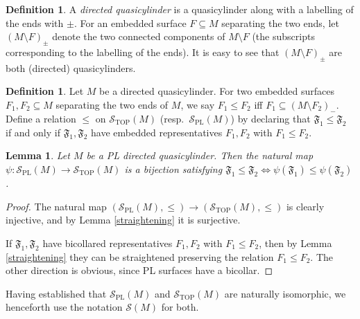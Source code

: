 \documentclass[12pt]{article}
\theoremstyle{plain}
\newtheorem{lemma}[theorem]{Lemma}
\theoremstyle{definition}
\newtheorem{definition}[theorem]{Definition}
\theoremstyle{remark}
\numberwithin{equation}{section}
\begin{document}
\begin{definition}
A \emph{directed quasicylinder} is a quasicylinder along with a labelling of the ends with $\pm$.  For an embedded surface $F\subseteq M$ separating the two ends, let $(M\setminus F)_\pm$ denote the two connected components of $M\setminus F$ (the subscripts corresponding to the labelling of the ends).  It is easy to see that $(M\setminus F)_\pm$ are both (directed) quasicylinders.
\end{definition}

\begin{definition}
Let $M$ be a directed quasicylinder.  For two embedded surfaces $F_1,F_2\subseteq M$ separating the two ends of $M$, we say $F_1\leq F_2$ iff $F_1\subseteq(M\setminus F_2)_-$.  Define a relation $\leq$ on $\mathcal S_{\operatorname{TOP}}(M)$ (resp.\ $\mathcal S_{\operatorname{PL}}(M)$) by declaring that $\mathfrak F_1\leq\mathfrak F_2$ if and only if $\mathfrak F_1,\mathfrak F_2$ have embedded representatives $F_1,F_2$ with $F_1\leq F_2$.
\end{definition}

\begin{lemma}\label{pltopequiv}
Let $M$ be a PL directed quasicylinder.  Then the natural map $\psi:\mathcal S_{\operatorname{PL}}(M)\to\mathcal S_{\operatorname{TOP}}(M)$ is a bijection satisfying $\mathfrak F_1\leq\mathfrak F_2\iff\psi(\mathfrak F_1)\leq\psi(\mathfrak F_2)$.
\end{lemma}

\begin{proof}
The natural map $(\mathcal S_{\operatorname{PL}}(M),\leq)\to(\mathcal S_{\operatorname{TOP}}(M),\leq)$ is clearly injective, and by Lemma \ref{straightening} it is surjective.

If $\mathfrak F_1,\mathfrak F_2$ have bicollared representatives $F_1,F_2$ with $F_1\leq F_2$, then by Lemma \ref{straightening} they can be straightened preserving the relation $F_1\leq F_2$.  The other direction is obvious, since PL surfaces have a bicollar.
\end{proof}

Having established that $\mathcal S_{\operatorname{PL}}(M)$ and $\mathcal S_{\operatorname{TOP}}(M)$ are naturally isomorphic, we henceforth use the notation $\mathcal S(M)$ for both.
\end{document}
